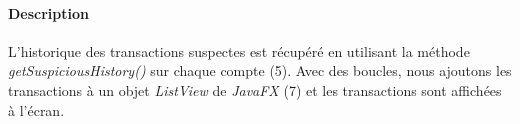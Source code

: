 \paragraph{Description} L'historique des transactions suspectes est récupéré en utilisant la méthode \emph{getSuspiciousHistory()} sur chaque compte (5). Avec des boucles, nous ajoutons les transactions à un objet \emph{ListView} de \emph{JavaFX} (7) et les transactions sont affichées à l'écran.
